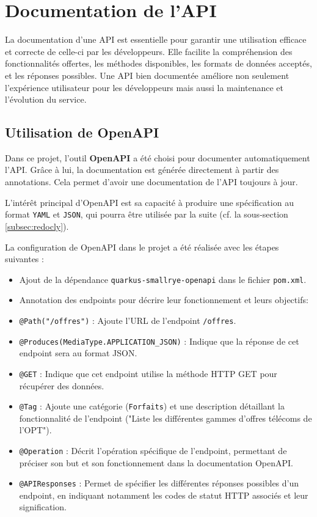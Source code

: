 \documentclass[11pt]{article}
\begin{document}
		\section{Documentation de l'API}
		
		La documentation d'une API est essentielle pour garantir une utilisation efficace et correcte de celle-ci par les développeurs. Elle facilite la compréhension des fonctionnalités offertes, les méthodes disponibles, les formats de données acceptés, et les réponses possibles. Une API bien documentée améliore non seulement l'expérience utilisateur pour les développeurs mais aussi la maintenance et l'évolution du service.
		
		\subsection{Utilisation de OpenAPI}
		
		Dans ce projet, l'outil \textbf{OpenAPI} a été choisi pour documenter automatiquement l'API. Grâce à lui, la documentation est générée directement à partir des annotations. Cela permet d'avoir une documentation de l'API toujours à jour. 
		
		L'intérêt principal d'OpenAPI est sa capacité à produire une spécification au format \texttt{YAML} et \texttt{JSON}, qui pourra être utilisée par la suite (cf. la sous-section \ref{subsec:redocly}).
		
		La configuration de OpenAPI dans le projet a été réalisée avec les étapes suivantes :
		\begin{itemize}
			\item Ajout de la dépendance \texttt{quarkus-smallrye-openapi} dans le fichier \texttt{pom.xml}.
			\item Annotation des endpoints pour décrire leur fonctionnement et leurs objectifs:
		\end{itemize}
			
		\begin{itemize}
			\item \texttt{@Path("/offres")} : Ajoute l'URL de l'endpoint \texttt{/offres}.
			\item \texttt{@Produces(MediaType.APPLICATION\_JSON)} : Indique que la réponse de cet endpoint sera au format JSON.
			\item \texttt{@GET} : Indique que cet endpoint utilise la méthode HTTP GET pour récupérer des données.
			\item \texttt{@Tag} : Ajoute une catégorie (\texttt{Forfaits}) et une description détaillant la fonctionnalité de l'endpoint ("Liste les différentes gammes d'offres télécoms de l'OPT").
			\item \texttt{@Operation} : Décrit l'opération spécifique de l'endpoint, permettant de préciser son but et son fonctionnement dans la documentation OpenAPI. \item \texttt{@APIResponses} : Permet de spécifier les différentes réponses possibles d'un endpoint, en indiquant notamment les codes de statut HTTP associés et leur signification. 
		\end{itemize}
	
\end{document}
